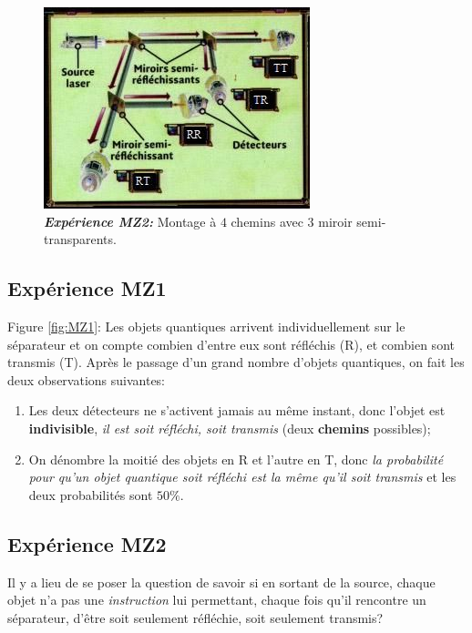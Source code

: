 \begin{figure}[ptbh]
\begin{minipage}[c]{.48\linewidth}
\else
	\includegraphics[scale=.9]{graphics/MZ2.jpg}%
\fi
\caption{\emph{\textbf{Expérience MZ2:}} Montage à
$4$ chemins avec $3$ miroir semi-transparents.}%
\label{fig:MZ2}%
\end{minipage}
\end{figure}

\subsection{Expérience MZ1}

Figure \ref{fig:MZ1}: Les objets quantiques arrivent individuellement sur le
séparateur et on compte combien d'entre eux sont réfléchis (R), et combien sont
transmis (T). Après le passage d'un grand nombre d'objets quantiques, on fait
les deux observations suivantes:

\begin{enumerate}
\item Les deux détecteurs ne s'activent jamais au même instant, donc
l'objet est \textbf{indivisible}, \emph{il est soit réfléchi, soit transmis}
(deux \textbf{chemins} possibles);

\item On dénombre la moitié des objets en R et l'autre en T, donc \emph{la
probabilité pour qu'un objet quantique soit réfléchi est la même qu'il soit
transmis} et les deux probabilités sont $50\%$.
\end{enumerate}

\subsection{Expérience MZ2}

Il y a lieu de se poser la question de savoir si en sortant de la source,
chaque objet n'a pas une \emph{instruction} lui permettant, chaque fois qu'il
rencontre un séparateur, d'être soit seulement réfléchie, soit seulement
transmis?

